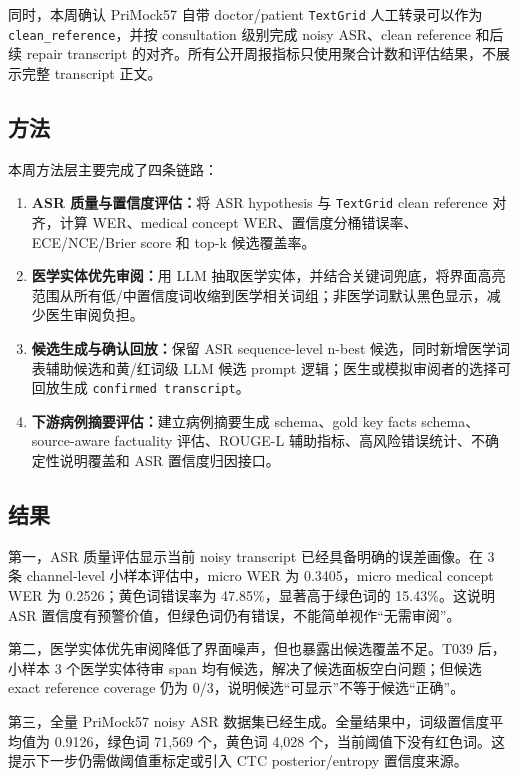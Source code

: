 \documentclass[UTF8,a4paper,12pt]{ctexart}
\newcommand{\code}[1]{\texttt{#1}}
\begin{document}
同时，本周确认 PriMock57 自带 doctor/patient \code{TextGrid} 人工转录可以作为 \code{clean\_reference}，并按 consultation 级别完成 noisy ASR、clean reference 和后续 repair transcript 的对齐。所有公开周报指标只使用聚合计数和评估结果，不展示完整 transcript 正文。

\subsection*{方法}

本周方法层主要完成了四条链路：

\begin{enumerate}
  \item \textbf{ASR 质量与置信度评估：}将 ASR hypothesis 与 \code{TextGrid} clean reference 对齐，计算 WER、medical concept WER、置信度分桶错误率、ECE/NCE/Brier score 和 top-k 候选覆盖率。
  \item \textbf{医学实体优先审阅：}用 LLM 抽取医学实体，并结合关键词兜底，将界面高亮范围从所有低/中置信度词收缩到医学相关词组；非医学词默认黑色显示，减少医生审阅负担。
  \item \textbf{候选生成与确认回放：}保留 ASR sequence-level n-best 候选，同时新增医学词表辅助候选和黄/红词级 LLM 候选 prompt 逻辑；医生或模拟审阅者的选择可回放生成 \code{confirmed transcript}。
  \item \textbf{下游病例摘要评估：}建立病例摘要生成 schema、gold key facts schema、source-aware factuality 评估、ROUGE-L 辅助指标、高风险错误统计、不确定性说明覆盖和 ASR 置信度归因接口。
\end{enumerate}

\subsection*{结果}

第一，ASR 质量评估显示当前 noisy transcript 已经具备明确的误差画像。在 3 条 channel-level 小样本评估中，micro WER 为 0.3405，micro medical concept WER 为 0.2526；黄色词错误率为 47.85\%，显著高于绿色词的 15.43\%。这说明 ASR 置信度有预警价值，但绿色词仍有错误，不能简单视作“无需审阅”。

第二，医学实体优先审阅降低了界面噪声，但也暴露出候选覆盖不足。T039 后，小样本 3 个医学实体待审 span 均有候选，解决了候选面板空白问题；但候选 exact reference coverage 仍为 0/3，说明候选“可显示”不等于候选“正确”。

第三，全量 PriMock57 noisy ASR 数据集已经生成。全量结果中，词级置信度平均值为 0.9126，绿色词 71,569 个，黄色词 4,028 个，当前阈值下没有红色词。这提示下一步仍需做阈值重标定或引入 CTC posterior/entropy 置信度来源。
\end{document}
